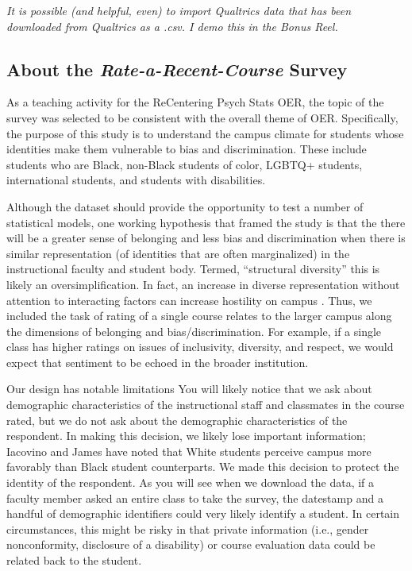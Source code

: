 \documentclass[
  english,
]{book}
\begin{document}
\emph{It is possible (and helpful, even) to import Qualtrics data that has been downloaded from Qualtrics as a .csv. I demo this in the Bonus Reel.}

\hypertarget{about-the-rate-a-recent-course-survey}{%
\subsection{\texorpdfstring{About the \emph{Rate-a-Recent-Course} Survey}{About the Rate-a-Recent-Course Survey}}\label{about-the-rate-a-recent-course-survey}}

As a teaching activity for the ReCentering Psych Stats OER, the topic of the survey was selected to be consistent with the overall theme of OER. Specifically, the purpose of this study is to understand the campus climate for students whose identities make them vulnerable to bias and discrimination. These include students who are Black, non-Black students of color, LGBTQ+ students, international students, and students with disabilities.

Although the dataset should provide the opportunity to test a number of statistical models, one working hypothesis that framed the study is that the there will be a greater sense of belonging and less bias and discrimination when there is similar representation (of identities that are often marginalized) in the instructional faculty and student body. Termed, ``structural diversity'' \citep{lewis_black_2019} this is likely an oversimplification. In fact, an increase in diverse representation without attention to interacting factors can increase hostility on campus \citep{hurtado_linking_2007}. Thus, we included the task of rating of a single course relates to the larger campus along the dimensions of belonging and bias/discrimination. For example, if a single class has higher ratings on issues of inclusivity, diversity, and respect, we would expect that sentiment to be echoed in the broader institution.

Our design has notable limitations You will likely notice that we ask about demographic characteristics of the instructional staff and classmates in the course rated, but we do not ask about the demographic characteristics of the respondent. In making this decision, we likely lose important information; Iacovino and James \citeyearpar{iacovino_retaining_2016} have noted that White students perceive campus more favorably than Black student counterparts. We made this decision to protect the identity of the respondent. As you will see when we download the data, if a faculty member asked an entire class to take the survey, the datestamp and a handful of demographic identifiers could very likely identify a student. In certain circumstances, this might be risky in that private information (i.e., gender nonconformity, disclosure of a disability) or course evaluation data could be related back to the student.
\end{document}
